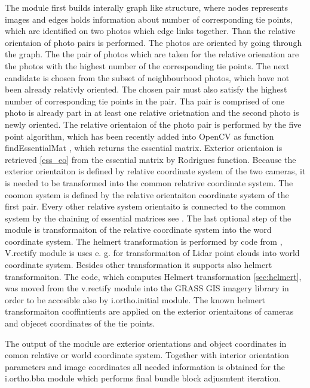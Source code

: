\documentclass[a4paper,12pt]{report}
\begin{document}
The module first builds interally graph like structure, where nodes represents images and edges holds information 
about number of corresponding tie points, which are identified on two photos which edge links together.
Than the relative orientaion of photo pairs is performed. The photos are oriented by going through the graph. 
The the pair of photos which are taken for the relative orienation are the photos with the highest number of the corresponding tie points. 
The next candidate is chosen from the subset of neighbourhood photos, which have not been already relativly oriented. The chosen pair 
must also satisfy the highest number of corresponding tie points in the pair. Tha pair is comprised of one photo is already 
part in at least one relative orietnation and the second photo is newly oriented. The relative orientaion of the photo 
pair is performed by  the five point algorithm, which has been recently added into OpenCV as function findEssentialMat \cite{calib_manual2013opencv},
which returns the essential matrix. Exterior orientaion is retrieved \ref{ess_eo} from the essential matrix by Rodrigues \cite{calib_manual2013opencv} 
function. Because the exterior orientaiton is defined by relative coordinate system of the two cameras, it is needed to be transformed into 
the common relatrive coordinate system. The coomon system is defined by the relative orientaiton coordinate system of the first pair.
Every other relative system orientaito is connected to the common system by the chaining of essential matrices see \label{sec:ess_chain}.
The last optional step of the module is transformaiton of the relative coordinate system into the word coordinate system. The helmert 
transformation is performed by code from \cite{v.rectify}, V.rectify module is uses e. g. for transformaiton of Lidar point clouds 
into world coordinate system. Besides other transformation it supports also helmert transformaiton. The code, which computes Helmert 
transformation \ref{sec:helmert}, was moved from the v.rectify module into the GRASS GIS imagery library in order to be accesible also  by i.ortho.initial
module. The known helmert transformaiton cooffintients are applied on the exterior orientaitons of cameras and objecet coordinates of the tie points.

The output of the module are exterior orientations and object coordinates in comon relative or world coordinate system. Together with interior
orientation parameters and image coordinates all needed information is obtained  for the i.ortho.bba module which performs final bundle block adjusmtent 
iteration.  
\end{document}
